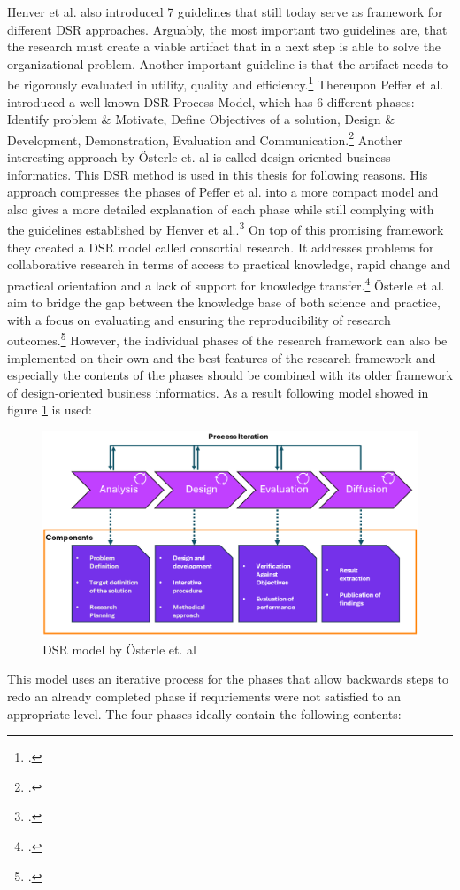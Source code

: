 Henver et al. also introduced 7 guidelines that still today serve as framework for different \ac{DSR} approaches.
Arguably, the most important two guidelines are, that the research must create a viable artifact that in a next step is able to solve the organizational problem. 
Another important guideline is that the artifact needs to be rigorously evaluated in utility, quality and efficiency.\footcite[83]{hevnerDesignScienceInformation2004a}
Thereupon Peffer et al. introduced a well-known \ac{DSR} Process Model, which has 6 different phases: Identify problem \& Motivate, Define Objectives of a solution, 
Design \& Development, Demonstration, Evaluation and Communication.\footcite[cf.][54]{peffersDesignScienceResearch2007a}
Another interesting approach by Österle et. al is called design-oriented business informatics. 
This \ac{DSR} method is used in this thesis for following reasons.
His approach compresses the phases of Peffer et al. into a more compact model and also gives a more detailed explanation of each phase while still complying with the guidelines established by Henver et al..\footcite[cf.][1-6]{oesterleMemorandumZurGestaltungsorientierten2010}
On top of this promising framework they created a \ac{DSR} model called consortial research.
It addresses problems for collaborative research in terms of access to practical knowledge, rapid change and practical orientation and a lack of support for knowledge transfer.\footcite[cf.][273-274]{oesterleKonsortialforschung2010}
Österle et al. aim to bridge the gap between the knowledge base of both science and practice, with a focus on evaluating and ensuring the reproducibility of research outcomes.\footcite[cf.][5]{oesterleMemorandumZurGestaltungsorientierten2010}
However, the individual phases of the research framework can also be implemented on their own and the best features 
of the research framework and especially the contents of the phases should be combined with its older framework of design-oriented business informatics.
As a result following model showed in figure \ref{DSR_Modell} is used:
\begin{figure}[H]
    \centering
    \includegraphics[width=0.9\linewidth]{graphics/DSR_Modell.png}
    \caption{DSR model by Österle et. al\protect\footnotemark}
    \label{DSR_Modell}
\end{figure}
This model uses an iterative process for the phases that allow backwards steps to redo an already completed phase if requriements were not satisfied to an appropriate level.
The four phases ideally contain the following contents:

